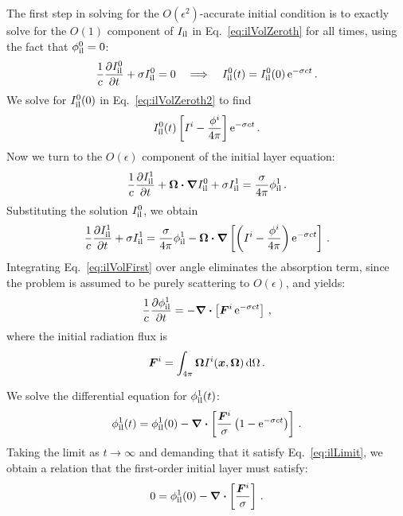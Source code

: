 The first step in solving for the $O(\epsilon^2)$-accurate initial condition is
to exactly solve for the $O(1)$ component of $I_\mathrm{il}$ in
Eq.~\eqref{eq:ilVolZeroth} for all times, using the fact that $\phi_\mathrm{il}^0=0$:
\begin{equation*}
  \frac{1}{c}\frac{\partial I_\mathrm{il}^0}{\partial t} + \sigma I_\mathrm{il}^0 = 0
  \quad \Longrightarrow \quad I_\mathrm{il}^0(t) = I_\mathrm{il}^0(0) \mathop{}\!\mathrm{e}^{-\sigma c t} \,.
\end{equation*}
We solve for $I_\mathrm{il}^0(0)$ in Eq.~\eqref{eq:ilVolZeroth2} to find
\begin{equation*}
 I_\mathrm{il}^0(t) \left[ I^i - \frac{\phi^i}{4\pi} \right] \mathop{}\!\mathrm{e}^{-\sigma c t}\,.
\end{equation*}
Now we turn to the $O(\epsilon)$ component of the initial layer equation:
\begin{equation*}
  \frac{1}{c}\frac{\partial I_\mathrm{il}^1}{\partial t}
  + \bm{\Omega}\bm{\cdot} \bm{\nabla} I_\mathrm{il}^0
  + \sigma I_\mathrm{il}^1
  = \frac{\sigma}{4\pi} \phi_\mathrm{il}^1 \,.
\end{equation*}
Substituting the solution $I_\mathrm{il}^0$, we obtain
\begin{equation}\label{eq:ilVolFirst}
  \frac{1}{c}\frac{\partial I_\mathrm{il}^1}{\partial t}
  + \sigma I_\mathrm{il}^1
  = \frac{\sigma}{4\pi} \phi_\mathrm{il}^1
  -  \bm{\Omega}\bm{\cdot} \bm{\nabla} \left[\left(  I^i - \frac{\phi^i}{4\pi} \right)
    \mathop{}\!\mathrm{e}^{-\sigma c t} \right] \,.
\end{equation}
Integrating Eq.~\eqref{eq:ilVolFirst} over angle eliminates the absorption
term, since the problem is assumed to be purely scattering to $O(\epsilon)$,
and yields:
\begin{equation*}
  \frac{1}{c}\frac{\partial \phi_\mathrm{il}^1}{\partial t}
  = - \bm{\nabla} \bm{\cdot} \left[\bm{F}^i \mathop{}\!\mathrm{e}^{-\sigma c t} \right] \,,
\end{equation*}
where the initial radiation flux is
\begin{equation*}
  \bm{F}^i = \int_{4\pi} \bm{\Omega} I^i(\bm{x},\bm{\Omega})\mathop{}\!\mathrm{d}\Omega\,.
\end{equation*}

We solve the differential equation for $\phi_\mathrm{il}^1(t)$:
\begin{equation*}
  \phi_\mathrm{il}^1(t) = \phi_\mathrm{il}^1(0) - \bm{\nabla} \bm{\cdot} \left[\frac{\bm{F}^i}{\sigma}
    \left( 1 - \mathop{}\!\mathrm{e}^{-\sigma c t} \right) \right] \,.
\end{equation*}
Taking the limit as $t\to\infty$ and demanding that it satisfy
Eq.~\eqref{eq:ilLimit}, we obtain a relation that the first-order initial
layer must satisfy:
\begin{equation}\label{eq:ilVolFirst2}
  0 = \phi_\mathrm{il}^1(0) - \bm{\nabla} \bm{\cdot} \left[\frac{\bm{F}^i}{\sigma} \right] \,.
\end{equation}

